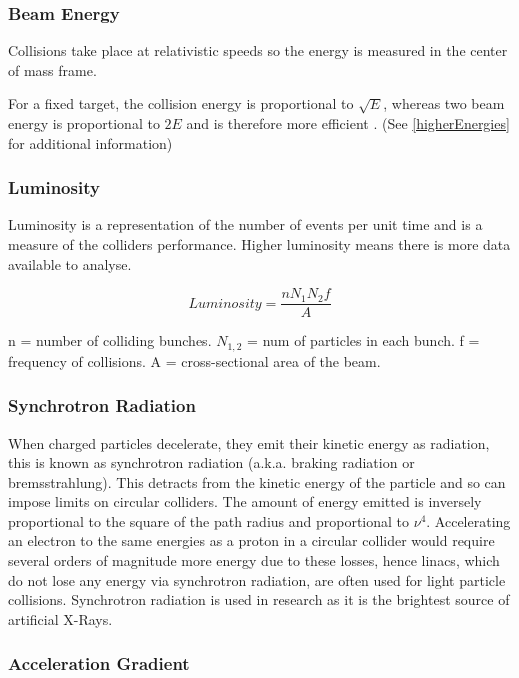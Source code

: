  \subsubsection{Beam Energy}
 
 Collisions take place at relativistic speeds so the energy is measured in the center \textendash of \textendash mass frame.
 
 For a fixed target, the collision energy is proportional to $\sqrt{E}$, whereas two beam energy is proportional to $2E$ and is therefore more efficient \cite{ITP:Energy}. (See \ref{higherEnergies} for additional information)
 
 \subsubsection{Luminosity}
 
 Luminosity is a representation of the number of events per unit time and is a measure of the colliders performance. Higher luminosity means there is more data available to analyse.
 
 $$
 Luminosity = \frac{n N_1 N_2 f}{A}
 $$
 
 n = number of colliding bunches. $N_{1,2}$ = num of particles in each bunch. f = frequency of collisions. A = cross-sectional area of the beam.
 
 \subsubsection{Synchrotron Radiation}
 
 When charged particles decelerate, they emit their kinetic energy as radiation, this is known as synchrotron radiation (a.k.a. braking radiation or bremsstrahlung). 
 This detracts from the kinetic energy of the particle and so can impose limits on circular colliders. 
 The amount of energy emitted is inversely proportional to the square of the path radius and proportional to $\nu^4$. Accelerating an electron to the same energies as a proton in a circular collider would require several orders of magnitude more energy due to these losses, hence linacs, which do not lose any energy via synchrotron radiation, are often used for light particle collisions. Synchrotron radiation is used in research as it is the brightest source of artificial X-Rays.
 
 \subsubsection{Acceleration Gradient}
 
